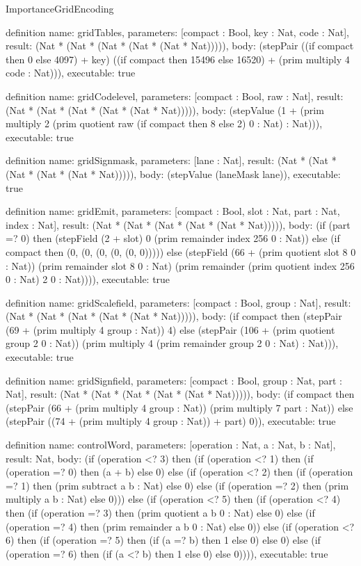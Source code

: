 \begin{lexlean}{ImportanceGridEncoding}
\begin{semanticmodule}
definition{
  name: gridTables,
  parameters: [compact : Bool, key : Nat, code : Nat],
  result: (Nat * (Nat * (Nat * (Nat * (Nat * Nat))))),
  body: (stepPair ((if compact then 0 else 4097) + key) ((if compact then 15496 else 16520) + (prim multiply 4 code : Nat))),
  executable: true
}

definition{
  name: gridCodelevel,
  parameters: [compact : Bool, raw : Nat],
  result: (Nat * (Nat * (Nat * (Nat * (Nat * Nat))))),
  body: (stepValue (1 + (prim multiply 2 (prim quotient raw (if compact then 8 else 2) 0 : Nat) : Nat))),
  executable: true
}

definition{
  name: gridSignmask,
  parameters: [lane : Nat],
  result: (Nat * (Nat * (Nat * (Nat * (Nat * Nat))))),
  body: (stepValue (laneMask lane)),
  executable: true
}

definition{
  name: gridEmit,
  parameters: [compact : Bool, slot : Nat, part : Nat, index : Nat],
  result: (Nat * (Nat * (Nat * (Nat * (Nat * Nat))))),
  body: (if (part =? 0) then (stepField (2 + slot) 0 (prim remainder index 256 0 : Nat)) else (if compact then (0, (0, (0, (0, (0, 0))))) else (stepField (66 + (prim quotient slot 8 0 : Nat)) (prim remainder slot 8 0 : Nat) (prim remainder (prim quotient index 256 0 : Nat) 2 0 : Nat)))),
  executable: true
}

definition{
  name: gridScalefield,
  parameters: [compact : Bool, group : Nat],
  result: (Nat * (Nat * (Nat * (Nat * (Nat * Nat))))),
  body: (if compact then (stepPair (69 + (prim multiply 4 group : Nat)) 4) else (stepPair (106 + (prim quotient group 2 0 : Nat)) (prim multiply 4 (prim remainder group 2 0 : Nat) : Nat))),
  executable: true
}

definition{
  name: gridSignfield,
  parameters: [compact : Bool, group : Nat, part : Nat],
  result: (Nat * (Nat * (Nat * (Nat * (Nat * Nat))))),
  body: (if compact then (stepPair (66 + (prim multiply 4 group : Nat)) (prim multiply 7 part : Nat)) else (stepPair ((74 + (prim multiply 4 group : Nat)) + part) 0)),
  executable: true
}

definition{
  name: controlWord,
  parameters: [operation : Nat, a : Nat, b : Nat],
  result: Nat,
  body: (if (operation <? 3) then
      (if (operation <? 1) then
      (if (operation =? 0) then (a + b) else 0) else
      (if (operation <? 2) then
      (if (operation =? 1) then (prim subtract a b : Nat) else 0) else
      (if (operation =? 2) then (prim multiply a b : Nat) else 0))) else
      (if (operation <? 5) then
      (if (operation <? 4) then
      (if (operation =? 3) then (prim quotient a b 0 : Nat) else 0) else
      (if (operation =? 4) then (prim remainder a b 0 : Nat) else 0)) else
      (if (operation <? 6) then
      (if (operation =? 5) then (if (a =? b) then 1 else 0) else 0) else
      (if (operation =? 6) then (if (a <? b) then 1 else 0) else 0)))),
  executable: true
}


\end{semanticmodule}
\end{lexlean}
